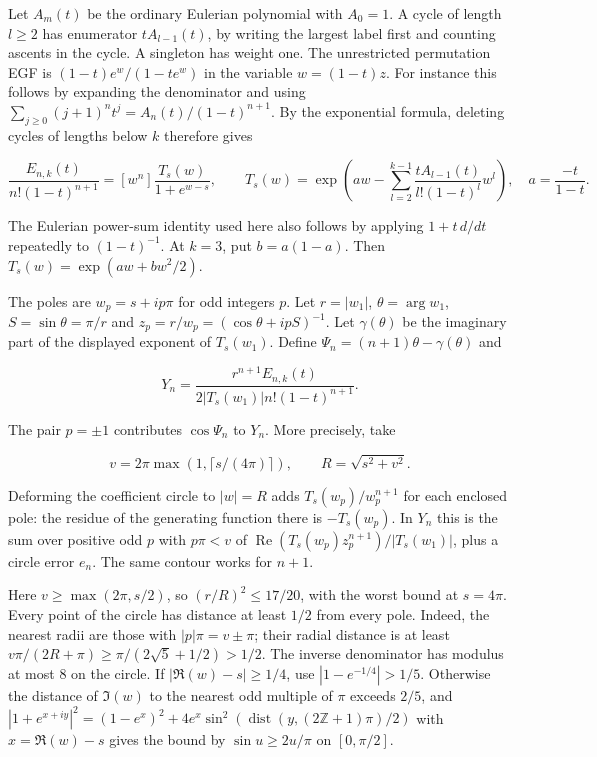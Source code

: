 \documentclass[11pt]{article}
\begin{document}
Let $A_m(t)$ be the ordinary Eulerian polynomial with $A_0=1$. A cycle of length $l\ge2$ has enumerator $t A_{l-1}(t)$, by writing the largest label first and counting ascents in the cycle. A singleton has weight one. The unrestricted permutation EGF is $(1-t)e^w/(1-te^w)$ in the variable $w=(1-t)z$. For instance this follows by expanding the denominator and using $\sum_{j\ge0}(j+1)^n t^j=A_n(t)/(1-t)^{n+1}$. By the exponential formula, deleting cycles of lengths below $k$ therefore gives

\[
 \frac{E_{n,k}(t)}{n!(1-t)^{n+1}}=[w^n]\frac{T_s(w)}{1+e^{w-s}},\qquad
 T_s(w)=\exp\!\left(a w-\sum_{l=2}^{k-1}
 \frac{t A_{l-1}(t)}{l!(1-t)^l}w^l\right),\quad a=\frac{-t}{1-t}.
\]

The Eulerian power-sum identity used here also follows by applying $1+t\,d/dt$ repeatedly to $(1-t)^{-1}$. At $k=3$, put $b=a(1-a)$. Then $T_s(w)=\exp(aw+bw^2/2)$.

The poles are $w_p=s+i p\pi$ for odd integers $p$. Let $r=|w_1|$, $\theta=\arg w_1$, $S=\sin\theta=\pi/r$ and $z_p=r/w_p=(\cos\theta+i pS)^{-1}$. Let $\gamma(\theta)$ be the imaginary part of the displayed exponent of $T_s(w_1)$. Define $\Psi_n=(n+1)\theta-\gamma(\theta)$ and

\[
 Y_n=\frac{r^{n+1} E_{n,k}(t)}{2|T_s(w_1)|n!(1-t)^{n+1}}.
\]

The pair $p=\pm1$ contributes $\cos\Psi_n$ to $Y_n$. More precisely, take

\[
 v=2\pi\max(1,\lceil s/(4\pi)\rceil),\qquad R=\sqrt{s^2+v^2}.
\]

Deforming the coefficient circle to $|w|=R$ adds $T_s(w_p)/w_p^{n+1}$ for each enclosed pole: the residue of the generating function there is $-T_s(w_p)$. In $Y_n$ this is the sum over positive odd $p$ with $p\pi<v$ of $\operatorname{Re}(T_s(w_p)z_p^{n+1})/|T_s(w_1)|$, plus a circle error $e_n$. The same contour works for $n+1$.

Here $v\ge\max(2\pi,s/2)$, so $(r/R)^2\le17/20$, with the worst bound at $s=4\pi$. Every point of the circle has distance at least $1/2$ from every pole. Indeed, the nearest radii are those with $|p|\pi=v\pm\pi$; their radial distance is at least $v\pi/(2R+\pi)\ge\pi/(2\sqrt5+1/2)>1/2$. The inverse denominator has modulus at most $8$ on the circle. If $|\Re(w)-s|\ge1/4$, use $|1-e^{-1/4}|>1/5$. Otherwise the distance of $\Im(w)$ to the nearest odd multiple of $\pi$ exceeds $2/5$, and $|1+e^{x+iy}|^2=(1-e^x)^2+4e^x\sin^2(\operatorname{dist}(y,(2\mathbb Z+1)\pi)/2)$ with $x=\Re(w)-s$ gives the bound by $\sin u\ge 2u/\pi$ on $[0,\pi/2]$.
\end{document}
